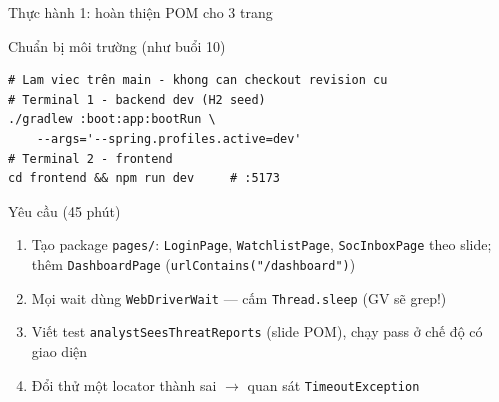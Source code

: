 \documentclass[aspectratio=169,12pt]{beamer}
\begin{document}
\begin{frame}[fragile]{Thực hành 1: hoàn thiện POM cho 3 trang}
  \vspace*{-0.5em}
  \begin{block}{Chuẩn bị môi trường (như buổi 10)}
\begin{lstlisting}[basicstyle=\ttfamily\scriptsize]
# Lam viec trên main - khong can checkout revision cu
# Terminal 1 - backend dev (H2 seed)
./gradlew :boot:app:bootRun \
    --args='--spring.profiles.active=dev'
# Terminal 2 - frontend
cd frontend && npm run dev     # :5173
\end{lstlisting}
  \end{block}

  \begin{exampleblock}{Yêu cầu (45 phút)}
    \begin{enumerate}
      \item Tạo package \texttt{pages/}: \texttt{LoginPage},
            \texttt{WatchlistPage}, \texttt{SocInboxPage} theo slide;
            thêm \texttt{DashboardPage} (\texttt{urlContains("/dashboard")})
      \item Mọi wait dùng \texttt{WebDriverWait} --- cấm
            \texttt{Thread.sleep} (GV sẽ grep!)
      \item Viết test \texttt{analystSeesThreatReports} (slide POM),
            chạy pass ở chế độ có giao diện
      \item Đổi thử một locator thành sai $\to$ quan sát
            \texttt{TimeoutException}
    \end{enumerate}
  \end{exampleblock}
\end{frame}
\end{document}
